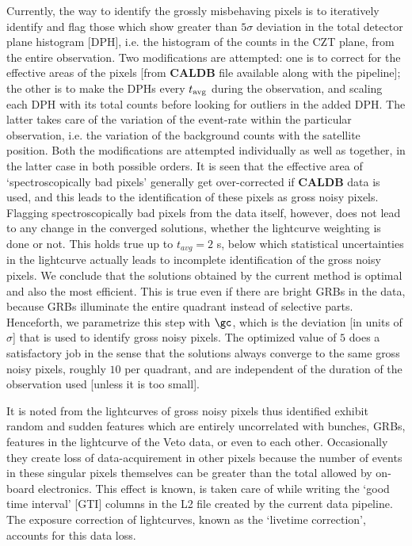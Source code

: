 Currently, the way to identify the grossly misbehaving pixels is to iteratively identify and flag those which show greater than $5 \sigma$ deviation in the total detector plane histogram [DPH], i.e. the histogram of the counts in the CZT plane, from the entire observation. Two modifications are attempted: one is to correct for the effective areas of the pixels [from \textbf{CALDB} file available along with the pipeline]; the other is to make the DPHs every $t_{{\rm avg}}$ during the observation, and scaling each DPH with its total counts before looking for outliers in the added DPH. The latter takes care of the variation of the event-rate within the particular observation, i.e. the variation of the background counts with the satellite position. Both the modifications are attempted individually as well as together, in the latter case in both possible orders. It is seen that the effective area of `spectroscopically bad pixels' generally get over-corrected if \textbf{CALDB} data is used, and this leads to the identification of these pixels as gross noisy pixels. Flagging spectroscopically bad pixels from the data itself, however, does not lead to any change in the converged solutions, whether the lightcurve weighting is done or not. This holds true up to $t_{avg} = 2$ s, below which statistical uncertainties in the lightcurve actually leads to incomplete identification of the gross noisy pixels. We conclude that the solutions obtained by the current method is optimal and also the most efficient. This is true even if there are bright GRBs in the data, because GRBs illuminate the entire quadrant instead of selective parts. Henceforth, we parametrize this step with $\gc$, which is the deviation [in units of $\sigma$] that is used to identify gross noisy pixels. The optimized value of $5$ does a satisfactory job in the sense that the solutions always converge to the same gross noisy pixels, roughly $10$ per quadrant, and are independent of the duration of the observation used [unless it is too small].

It is noted from the lightcurves of gross noisy pixels thus identified exhibit random and sudden features which are entirely uncorrelated with bunches, GRBs, features in the lightcurve of the Veto data, or even to each other. Occasionally they create loss of data-acquirement in other pixels because the number of events in these singular pixels themselves can be greater than the total allowed by on-board electronics. This effect is known, is taken care of while writing the `good time interval' [GTI] columns in the L2 file created by the current data pipeline. The exposure correction of lightcurves, known as the `livetime correction', accounts for this data loss.







